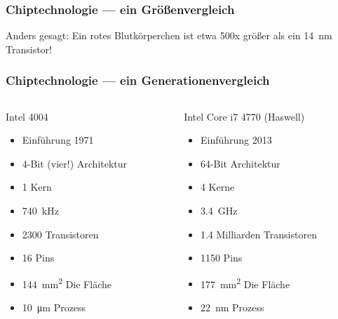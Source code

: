 \begin{frame}
	\frametitle{Chiptechnologie --- ein Größenvergleich}
	\begin{exampleblock}{Anders gesagt:}
		Ein rotes Blutkörperchen ist etwa 500x größer als ein \SI{14}{\nano\meter} Transistor!

	\end{exampleblock}
\end{frame}

\begin{frame}
	\frametitle{Chiptechnologie --- ein Generationenvergleich}
	\begin{columns}[t]
		\begin{column}{.45\textwidth}
			\begin{block}{Intel 4004}
				\begin{itemize}
					\item Einführung 1971
					\item 4-Bit (vier!) Architektur
					\item 1 Kern
					\item \SI{740}{\kilo\hertz}
					\item 2300 Transistoren
					\item 16 Pins
					\item \SI{144}{\milli\meter\squared} Die Fläche
					\item \SI{10}{\micro\meter} Prozess
				\end{itemize}
			\end{block}
		\end{column}
		\begin{column}{.55\textwidth}
			\begin{block}{Intel Core i7 4770 (Haswell)}
				\begin{itemize}
					\item Einführung 2013
					\item 64-Bit Architektur
					\item 4 Kerne
					\item \SI{3.4}{\giga\hertz}
					\item 1.4 Milliarden Transistoren
					\item 1150 Pins
					\item \SI{177}{\milli\meter\squared} Die Fläche
					\item \SI{22}{\nano\meter} Prozess
				\end{itemize}
			\end{block}
		\end{column}
	\end{columns}
\end{frame}

